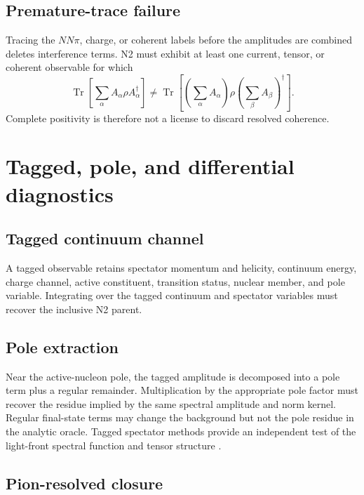 \documentclass[11pt]{article}
\newcommand{\Tr}{\operatorname{Tr}}
\begin{document}
\subsection{Premature-trace failure}

Tracing the \(NN\pi\), charge, or coherent labels before the amplitudes are
combined deletes interference terms.  N2 must exhibit at least one current,
tensor, or coherent observable for which
\begin{equation}
 \Tr\left[\sum_\alpha A_\alpha\rho A_\alpha^{\dagger}\right]
 \neq
 \Tr\left[
 \left(\sum_\alpha A_\alpha\right)
 \rho
 \left(\sum_\beta A_\beta\right)^{\dagger}
 \right].
 \label{eq:premature-trace}
\end{equation}
Complete positivity is therefore not a license to discard resolved coherence.

\section{Tagged, pole, and differential diagnostics}
\label{sec:tagged}

\subsection{Tagged continuum channel}

A tagged observable retains spectator momentum and helicity, continuum
energy, charge channel, active constituent, transition status, nuclear
member, and pole variable.  Integrating over the tagged continuum and
spectator variables must recover the inclusive N2 parent.

\subsection{Pole extraction}

Near the active-nucleon pole, the tagged amplitude is decomposed into a pole
term plus a regular remainder.  Multiplication by the appropriate pole factor
must recover the residue implied by the same spectral amplitude and norm
kernel.  Regular final-state terms may change the background but not the pole
residue in the analytic oracle.  Tagged spectator methods provide an
independent test of the light-front spectral function and tensor structure
\cite{CosynWeiss2020}.

\subsection{Pion-resolved closure}
\end{document}
